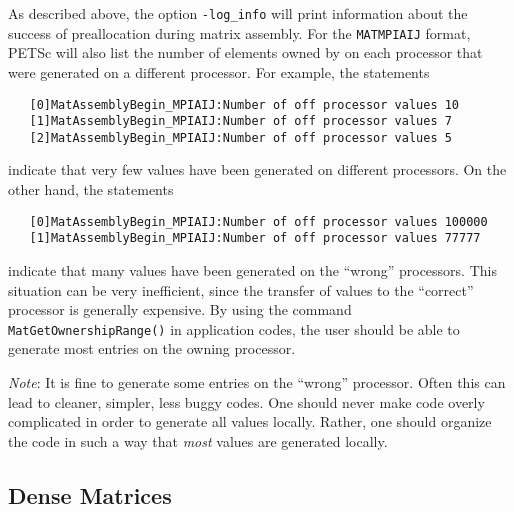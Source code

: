 As described above, the option {\tt -log\_info} 
will print information about the success of preallocation during
matrix assembly.  For the {\tt MATMPIAIJ} format, PETSc will also list
the number of elements owned by on each processor that were generated
on a different processor.  For example, the statements
\begin{verbatim}
   [0]MatAssemblyBegin_MPIAIJ:Number of off processor values 10
   [1]MatAssemblyBegin_MPIAIJ:Number of off processor values 7
   [2]MatAssemblyBegin_MPIAIJ:Number of off processor values 5
\end{verbatim}
indicate that very few values have been generated on different processors.
On the other hand, the statements
\begin{verbatim}
   [0]MatAssemblyBegin_MPIAIJ:Number of off processor values 100000
   [1]MatAssemblyBegin_MPIAIJ:Number of off processor values 77777
\end{verbatim}
indicate that many values have been generated on the ``wrong'' processors.
This situation can be very inefficient, since the transfer of values
to the ``correct'' processor is generally expensive.  By using the command
{\tt MatGetOwnershipRange()} in application codes, the user should be able
to generate most entries on the owning processor.

{\em Note}: It is fine to generate some entries on the ``wrong'' processor. Often
this can lead to cleaner, simpler, less buggy codes.  One should never
make code overly complicated in order to generate all values locally. Rather,
one should organize the code in such a way that {\em most} values are generated locally.

\subsection{Dense Matrices}
\label{sec:matdense}

